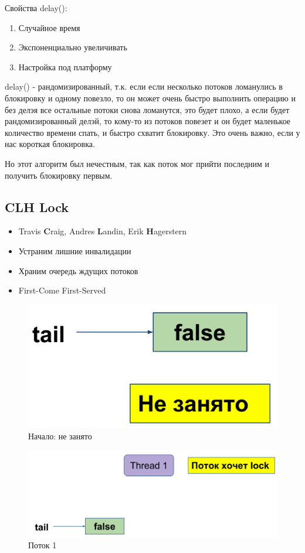\documentclass[10pt,a4paper,oneside,titlepage]{article}
\theoremstyle{plain}
\theoremstyle{defenition}
\begin{document}
Свойства delay():
\begin{enumerate}
	\item Случайное время
	\item Экспоненциально увеличивать
	\item Настройка под платформу
\end{enumerate}

delay() - рандомизированный, т.к. если если несколько потоков ломанулись в блокировку и одному повезло, то он может очень быстро выполнить операцию и без делэя все остальные потоки снова ломанутся, это будет плохо, а если будет рандомизированный делэй, то кому-то из потоков повезет и он будет маленькое количество времени спать, и быстро схватит блокировку. Это очень важно, если у нас короткая блокировка.

Но этот алгоритм был нечестным, так как поток мог прийти последним и получить блокировку первым.

\subsection{CLH Lock}

\begin{itemize}
	\item Travis {\bfseries C}raig, Andres {\bfseries L}andin, Erik {\bfseries H}agerstern
	\item Устраним лишние инвалидации
	\item Храним очередь ждущих потоков
	\item First-Come First-Served
\end{itemize}

\begin{figure}[h!]
	\centering
	\includegraphics[width=0.4\linewidth]{pictures/CLH1}
	\caption{Начало: не занято}
	\label{fig:clh1}
\end{figure}

\begin{figure}[h!]
	\centering
	\includegraphics[width=0.4\linewidth]{pictures/CLH2}
	\caption{Поток 1}
	\label{fig:clh2}
\end{figure}
\end{document}
